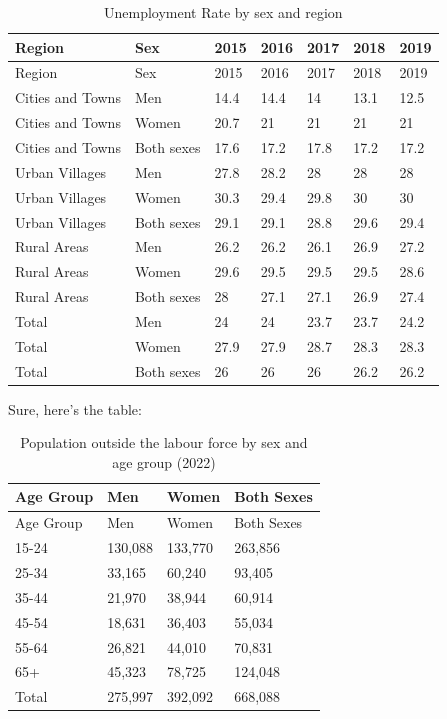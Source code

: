 \documentclass[
]{book}
\theoremstyle{definition}
\theoremstyle{definition}
\theoremstyle{definition}
\theoremstyle{definition}
\theoremstyle{remark}
\begin{document}
\begin{longtable}[]{@{}lllllll@{}}
\caption{\label{tab:table41} Unemployment Rate by sex and region}\tabularnewline
\toprule()
Region & Sex & 2015 & 2016 & 2017 & 2018 & 2019 \\
\midrule()
\endfirsthead
\toprule()
Region & Sex & 2015 & 2016 & 2017 & 2018 & 2019 \\
\midrule()
\endhead
Cities and Towns & Men & 14.4 & 14.4 & 14 & 13.1 & 12.5 \\
Cities and Towns & Women & 20.7 & 21 & 21 & 21 & 21 \\
Cities and Towns & Both sexes & 17.6 & 17.2 & 17.8 & 17.2 & 17.2 \\
Urban Villages & Men & 27.8 & 28.2 & 28 & 28 & 28 \\
Urban Villages & Women & 30.3 & 29.4 & 29.8 & 30 & 30 \\
Urban Villages & Both sexes & 29.1 & 29.1 & 28.8 & 29.6 & 29.4 \\
Rural Areas & Men & 26.2 & 26.2 & 26.1 & 26.9 & 27.2 \\
Rural Areas & Women & 29.6 & 29.5 & 29.5 & 29.5 & 28.6 \\
Rural Areas & Both sexes & 28 & 27.1 & 27.1 & 26.9 & 27.4 \\
Total & Men & 24 & 24 & 23.7 & 23.7 & 24.2 \\
Total & Women & 27.9 & 27.9 & 28.7 & 28.3 & 28.3 \\
Total & Both sexes & 26 & 26 & 26 & 26.2 & 26.2 \\
\bottomrule()
\end{longtable}

Sure, here's the table:

\begin{longtable}[]{@{}llll@{}}
\caption{\label{tab:table42} Population outside the labour force by sex and age group (2022)}\tabularnewline
\toprule()
Age Group & Men & Women & Both Sexes \\
\midrule()
\endfirsthead
\toprule()
Age Group & Men & Women & Both Sexes \\
\midrule()
\endhead
15-24 & 130,088 & 133,770 & 263,856 \\
25-34 & 33,165 & 60,240 & 93,405 \\
35-44 & 21,970 & 38,944 & 60,914 \\
45-54 & 18,631 & 36,403 & 55,034 \\
55-64 & 26,821 & 44,010 & 70,831 \\
65+ & 45,323 & 78,725 & 124,048 \\
Total & 275,997 & 392,092 & 668,088 \\
\bottomrule()
\end{longtable}
\end{document}
